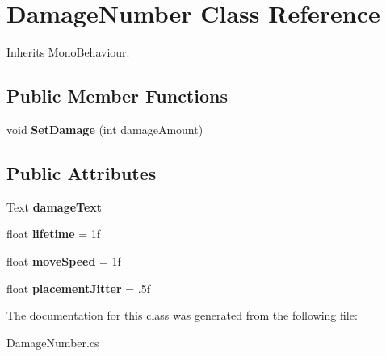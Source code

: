 \hypertarget{class_damage_number}{}\section{Damage\+Number Class Reference}
\label{class_damage_number}


Inherits Mono\+Behaviour.

\subsection*{Public Member Functions}
\begin{DoxyCompactItemize}
\item 
\mbox{\label{class_damage_number_ab282525544e3853192422fe517016677}} 
void {\bfseries Set\+Damage} (int damage\+Amount)
\end{DoxyCompactItemize}
\subsection*{Public Attributes}
\begin{DoxyCompactItemize}
\item 
\mbox{\label{class_damage_number_a23be8dd9ecda1c4a849310d847cf01ba}} 
Text {\bfseries damage\+Text}
\item 
\mbox{\label{class_damage_number_a74bfb78527ffe5917c989dbd78f9f2d5}} 
float {\bfseries lifetime} = 1f
\item 
\mbox{\label{class_damage_number_a7a81910d4b3009346af9a9ad8281ad19}} 
float {\bfseries move\+Speed} = 1f
\item 
\mbox{\label{class_damage_number_ac37c2f6a999f33209db8a0f2cb6e61b9}} 
float {\bfseries placement\+Jitter} = .\+5f
\end{DoxyCompactItemize}


The documentation for this class was generated from the following file\+:\begin{DoxyCompactItemize}
\item 
Damage\+Number.\+cs\end{DoxyCompactItemize}
